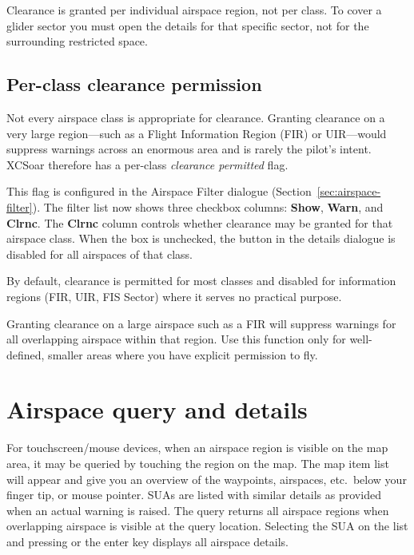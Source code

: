 \tip Clearance is granted per individual airspace region, not per
class.  To cover a glider sector you must open the details for that
specific sector, not for the surrounding restricted space.

\subsection*{Per-class clearance permission}

Not every airspace class is appropriate for clearance.  Granting
clearance on a very large region---such as a Flight Information Region
(FIR) or UIR---would suppress warnings across an enormous area and is
rarely the pilot's intent.  XCSoar therefore has a per-class
\emph{clearance permitted} flag.

This flag is configured in the Airspace Filter dialogue
(Section~\ref{sec:airspace-filter}).  The filter list now shows three
checkbox columns: \textbf{Show}, \textbf{Warn}, and \textbf{Clrnc}.
The \textbf{Clrnc} column controls whether clearance may be granted
for that airspace class.  When the box is unchecked, the
 button in the details dialogue is disabled for
all airspaces of that class.

By default, clearance is permitted for most classes and disabled for
information regions (FIR, UIR, FIS Sector) where it serves no
practical purpose.

\warning Granting clearance on a large airspace such as a FIR will
suppress warnings for all overlapping airspace within that region.
Use this function only for well-defined, smaller areas where you have
explicit permission to fly.


\section{Airspace query and details}

For touchscreen/mouse devices, when an airspace region is visible on
the map area, it may be queried by touching the region on the map.  
The map item list will appear and give you an overview of the waypoints, 
airspaces, etc.\ below your finger tip, or mouse pointer.  SUAs are listed with
similar details as provided when an actual warning is raised.  
The query returns all airspace regions when overlapping airspace is visible at 
the query location.
Selecting the SUA on the list and pressing  or the enter key 
displays all airspace details. 

